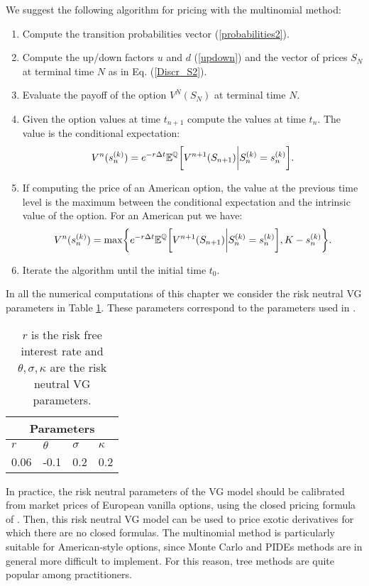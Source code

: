 We suggest the following algorithm for pricing with the multinomial method:
\begin{enumerate}
 \item Compute the transition probabilities vector (\ref{probabilities2}). 
 \item Compute the up/down factors $u$ and $d$ (\ref{updown}) and the vector of prices $S_N$ at terminal time $N$ as in Eq. (\ref{Discr_S2}).
 \item Evaluate the payoff of the option $V^N(S_N)$ at terminal time $N$.
 \item Given the option values at time $t_{n+1}$ compute the values at time $t_n$. The value is the conditional expectation:
 \begin{equation}
 V^n(s^{(k)}_n) = e^{-r\Delta t} \mathbb{E}^{\mathbb{Q}} \biggl[ V^{n+1}(S_{n+1}) \bigg| S^{(k)}_n = s^{(k)}_n \biggr]. 
\end{equation}
 \item If computing the price of an American option, the value at the previous time level is the maximum between the conditional expectation and
 the intrinsic value of the option. For an American put we have:
 \begin{equation}
 V^n(s^{(k)}_n) = \max \biggr \{ e^{-r\Delta t} \mathbb{E}^{\mathbb{Q}} \biggl[ V^{n+1}(S_{n+1}) \bigg| S^{(k)}_n = s^{(k)}_n \biggr] , K-s^{(k)}_n \biggr \}. 
\end{equation}	
 \item Iterate the algorithm until the initial time $t_0$. 
\end{enumerate}

In all the numerical computations of this chapter we consider the risk neutral VG parameters in Table \ref{sample-table}. These parameters correspond to the parameters used 
in \cite{Canta2}.

\begin{table}[!h]
\centering
{\begin{tabular}{llll}
\toprule
 \multicolumn{4}{c}{Parameters} \\
\midrule
$r$ & $\theta$ & $\sigma$ & $\kappa$ \\ 
0.06 & -0.1 & 0.2 & 0.2 \\
\bottomrule
\end{tabular}}
\caption{$r$ is the risk free interest rate and $\theta, \sigma, \kappa$ are the risk neutral VG parameters.}
\label{sample-table}
\end{table}

\begin{Remark}
In practice, the risk neutral parameters of the VG model should be calibrated from market prices of European vanilla options, using the closed pricing formula of \cite{MCC98}.
Then, this risk neutral VG model can be used to price exotic derivatives for which there are no closed formulas.
The multinomial method is particularly suitable for American-style options, since Monte Carlo and PIDEs methods are in general more difficult to implement. 
For this reason, tree methods are quite popular among practitioners. 
\end{Remark}







